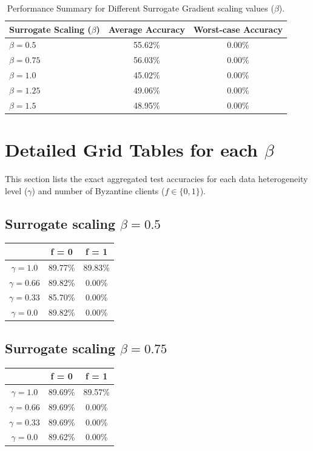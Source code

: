 \documentclass{article}
\begin{document}
\begin{table}[htbp]
    \centering
    \caption{Performance Summary for Different Surrogate Gradient scaling values ($\beta$).}
    \label{tab:summary}
    \begin{tabular}{lcc}
        \toprule
        \textbf{Surrogate Scaling ($\beta$)} & \textbf{Average Accuracy} & \textbf{Worst-case Accuracy} \\
        \midrule
        $\beta = 0.5$ & 55.62\% & 0.00\% \\
        $\beta = 0.75$ & 56.03\% & 0.00\% \\
        $\beta = 1.0$ & 45.02\% & 0.00\% \\
        $\beta = 1.25$ & 49.06\% & 0.00\% \\
        $\beta = 1.5$ & 48.95\% & 0.00\% \\
        \bottomrule
    \end{tabular}
\end{table}

\section{Detailed Grid Tables for each $\beta$}
This section lists the exact aggregated test accuracies for each data heterogeneity level ($\gamma$) and number of Byzantine clients ($f \in \{0, 1\}$).

\subsection{Surrogate scaling $\beta = 0.5$}
\begin{table}[htbp]
    \centering
    \begin{tabular}{ccc}
        \toprule
        & \textbf{f = 0} & \textbf{f = 1} \\
        \midrule
        $\gamma = 1.0$ & 89.77\% & 89.83\% \\
        $\gamma = 0.66$ & 89.82\% & 0.00\% \\
        $\gamma = 0.33$ & 85.70\% & 0.00\% \\
        $\gamma = 0.0$ & 89.82\% & 0.00\% \\
        \bottomrule
    \end{tabular}
\end{table}
\subsection{Surrogate scaling $\beta = 0.75$}
\begin{table}[htbp]
    \centering
    \begin{tabular}{ccc}
        \toprule
        & \textbf{f = 0} & \textbf{f = 1} \\
        \midrule
        $\gamma = 1.0$ & 89.69\% & 89.57\% \\
        $\gamma = 0.66$ & 89.69\% & 0.00\% \\
        $\gamma = 0.33$ & 89.69\% & 0.00\% \\
        $\gamma = 0.0$ & 89.62\% & 0.00\% \\
        \bottomrule
    \end{tabular}
\end{table}
\end{document}
